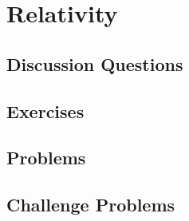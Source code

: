 
\chapter{Relativity}

\section{Discussion Questions}

\section{Exercises}

\section{Problems}

\section{Challenge Problems}
